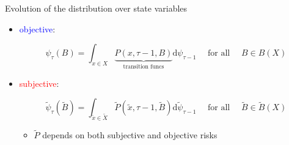 \documentclass{beamer}
\begin{document}

\begin{frame}{Evolution of the distribution over state variables}
	\begin{itemize}
		\item \textcolor{blue}{objective}: 
		
		\begin{equation*}
			\label{Eq:DistDynObj}
			\psi_{\tau}(B)=\int_{x \in X} \underbrace{P(x, \tau-1, B)}_{\text{transition funcs}}  \mathrm{d}\psi_{\tau-1} \quad \text { for all } \quad B\in B(X)
		\end{equation*}
		
	
		\item \textcolor{red}{subjective}: 
		
		\begin{equation*}
			\label{Eq:DistDynSub}
			\tilde \psi_{\tau}(\tilde B)=\int_{\tilde x \in \tilde X} \tilde P(\tilde x, \tau-1, \tilde B) \mathrm{d} \tilde \psi_{\tau-1} \quad \text { for all } \quad \tilde B \in \tilde B(X)
		\end{equation*}
		\begin{itemize}
			\item $\tilde P$ depends on both subjective and objective risks 
		\end{itemize}
	\end{itemize}
\end{frame}
\end{document}
